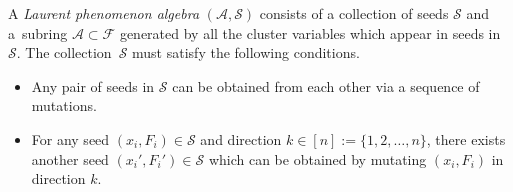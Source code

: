 \documentclass[pdftex]{sigma}
\numberwithin{equation}{section}
\newcommand{\new}[1]{{#1}}
\begin{document}
\begin{Definition}
A \emph{Laurent phenomenon algebra} $(\mathcal{A}, \mathcal{S})$ consists of a collection of seeds $\mathcal{S}$ and a~subring $\mathcal{A} \subset \mathcal{F}$ generated by all the cluster variables which appear in seeds in~$\mathcal{S}$. The collection~$\mathcal{S}$ must satisfy the following conditions.
\begin{itemize}\itemsep=0pt
 \item Any pair of seeds in $\mathcal{S}$ can be obtained from each other via a sequence of mutations.
 \item For any seed $(x_i,F_i) \in \mathcal{S}$ and direction $k \in [n]\new{:=\{1,2,\dots,n\}}$, there exists another seed $(x_i',F_i') \in \mathcal{S}$ which can be obtained by mutating $(x_i,F_i)$ in direction $k$.
\end{itemize}
\end{Definition}
\end{document}
